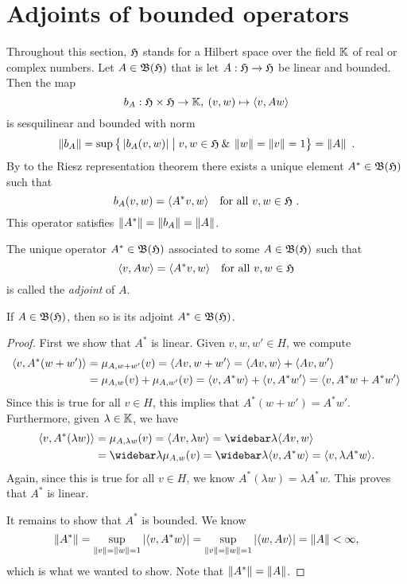 \section{Adjoints of bounded operators}
\label{sec:adjoints-bounded-operators}

\para 
Throughout this section, $\mathfrak{H}$ stands for a Hilbert space over the 
field $\mathbb{K}$ of real or complex numbers. 
Let $A \in \mathfrak{B} (\mathfrak{H})$ that is let 
$A:\mathfrak{H} \rightarrow \mathfrak{H}$ be linear and bounded. Then the map
\[
 b_A : \mathfrak{H} \times \mathfrak{H} \to \mathbb{K}, \: (v,w) \mapsto \langle v, Aw \rangle 
\]
is sesquilinear and bounded with norm
\[
\left\|b_A\right\| = \sup \big\{ \left| b_A(v,w)\right| \bigm\vert
   v,w\in \mathfrak{H} \:\&\: \left\|w\right\|=\left\|v\right\|=1 \big\} = 
                \left\|A\right\| \ .
\]
By  
to the Riesz representation theorem there exists a unique element 
$A^* \in \mathfrak{B}(\mathfrak{H})$ such that
\[
 b_A (v,w) = \langle A^* v, w \rangle \quad 
 \text{for all } v,w \in \mathfrak{H} \ .
\]
This operator satisfies $\left\|A^*\right\|= \left\|b_A\right\| = \left\|A\right\|$. 
\begin{definition}
The unique operator $A^*\in \mathfrak{B} (\mathfrak{H})$ associated to some 
$A\in \mathfrak{B}(\mathfrak{H})$ such that 
\[
 \langle v,Aw \rangle = \langle A^* v, w \rangle \quad 
 \text{for all } v,w \in \mathfrak{H} 
\]
is called the \emph{adjoint} of $A$.
\end{definition}

\begin{proposition}
If $A \in \mathfrak{B} (\mathfrak{H})$, then so is its adjoint $A^* \in \mathfrak{B} (\mathfrak{H})$.
\end{proposition}

\begin{proof}
First we show that $A^*$ is linear. Given $v, w, w' \in H$, we compute
\begin{align*}
\langle v, A^*(w + w') \rangle &= \mu_{A, w+w'}(v) = \langle Av, w + w' \rangle = \langle Av, w \rangle + \langle Av, w' \rangle\\
&= \mu_{A, w}(v) + \mu_{A, w'}(v) = \langle v, A^*w \rangle + \langle v, A^*w' \rangle = \langle v, A^*w + A^*w' \rangle
\end{align*}
Since this is true for all $v \in H$, this implies that $A^*(w+w') = A^*w'$.  Furthermore, given $\lambda \in \mathbb{K}$, we have
\begin{align*}
\inprod{v, A^*(\lambda w)} &= \mu_{A, \lambda w}(v) = \inprod{Av, \lambda w} = \widebar \lambda \inprod{Av, w}\\
&= \widebar \lambda \mu_{A, w}(v) = \widebar \lambda \inprod{v, A^* w} = \inprod{v, \lambda A^*w}.
\end{align*}
Again, since this is true for all $v \in H$, we know $A^*(\lambda w) = \lambda A^*w$. This proves that $A^*$ is linear.

It remains to show that $A^*$ is bounded. We know
\[
\left\|A^*\right\| = \sup_{\left\|v\right\| = \left\|w\right\| = 1} {\left|\langle v, A^* w \rangle\right|} = \sup_{\left\|v\right\| = \left\|w\right\| = 1} {\left|\langle w, Av \rangle\right|} = \left\|A\right\| < \infty,
\]
which is what we wanted to show. Note that $\left\|A^*\right\| = \left\|A\right\|$.
\end{proof}

